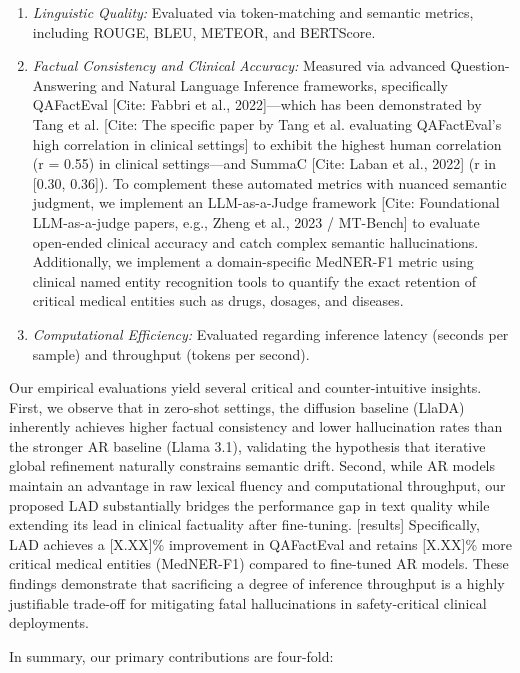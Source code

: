 \documentclass[11pt]{article}
\begin{document}
\begin{enumerate}
    \item \textit{Linguistic Quality:} Evaluated via token-matching and semantic metrics, including ROUGE, BLEU, METEOR, and BERTScore.
    \item \textit{Factual Consistency and Clinical Accuracy:} Measured via advanced Question-Answering and Natural Language Inference frameworks, specifically QAFactEval [Cite: Fabbri et al., 2022]—which has been demonstrated by Tang et al. [Cite: The specific paper by Tang et al. evaluating QAFactEval's high correlation in clinical settings] to exhibit the highest human correlation (r = 0.55) in clinical settings—and SummaC [Cite: Laban et al., 2022] (r in [0.30, 0.36]). To complement these automated metrics with nuanced semantic judgment, we implement an LLM-as-a-Judge framework [Cite: Foundational LLM-as-a-judge papers, e.g., Zheng et al., 2023 / MT-Bench] to evaluate open-ended clinical accuracy and catch complex semantic hallucinations. Additionally, we implement a domain-specific MedNER-F1 metric using clinical named entity recognition tools to quantify the exact retention of critical medical entities such as drugs, dosages, and diseases.
    \item \textit{Computational Efficiency:} Evaluated regarding inference latency (seconds per sample) and throughput (tokens per second).
\end{enumerate}
Our empirical evaluations yield several critical and counter-intuitive insights. First, we observe that in zero-shot settings, the diffusion baseline (LlaDA) inherently achieves higher factual consistency and lower hallucination rates than the stronger AR baseline (Llama 3.1), validating the hypothesis that iterative global refinement naturally constrains semantic drift. Second, while AR models maintain an advantage in raw lexical fluency and computational throughput, our proposed LAD substantially bridges the performance gap in text quality while extending its lead in clinical factuality after fine-tuning. [results] Specifically, LAD achieves a [X.XX]\% improvement in QAFactEval and retains [X.XX]\% more critical medical entities (MedNER-F1) compared to fine-tuned AR models. These findings demonstrate that sacrificing a degree of inference throughput is a highly justifiable trade-off for mitigating fatal hallucinations in safety-critical clinical deployments.

In summary, our primary contributions are four-fold:
\end{document}

